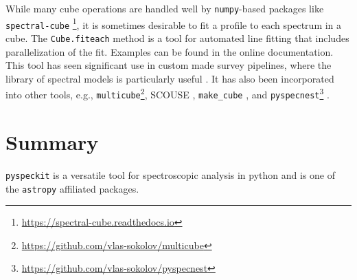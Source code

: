 \documentclass[twocolumn,linenumbers]{aastex63}
\newcommand{\pyspeckit}{\texttt{pyspeckit}\xspace}
\newcommand{\astropy}{\texttt{astropy}\xspace}
\begin{document}
While many cube operations are handled well by \texttt{numpy}-based packages
like \texttt{spectral-cube} \citep{Robitaille2016,Ginsburg2019}\footnote{\url{https://spectral-cube.readthedocs.io}},
it is sometimes desirable to fit a profile to each spectrum
in a cube.  The \texttt{Cube.fiteach} method is a tool for automated line
fitting that includes parallelization of the fit.  Examples can be
found in the online documentation. 
This tool  has  seen significant use in 
custom made survey pipelines, where the library of spectral models is particularly useful
\citep[e.g,][\url{https://github.com/GBTAmmoniaSurvey/GAS}]{Friesen2017}. 
 It has also been incorporated into other tools, e.g.,
\texttt{multicube}\footnote{\url{https://github.com/vlas-sokolov/multicube}}, SCOUSE \citep[][see Appendix \ref{appendix:scouse}]{Henshaw2016,Henshaw2019}, \texttt{make\_cube} \citep{Youngblood2016}, and \texttt{pyspecnest}\footnote{\url{https://github.com/vlas-sokolov/pyspecnest}} \citep{Sokolov2020-pyspecnest}.





\section{Summary}
\label{sec:summary}

\texttt{pyspeckit} is a versatile tool for spectroscopic analysis in python and
is one of the \astropy affiliated packages.
% 

\end{document}
